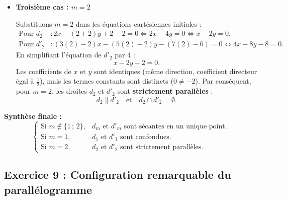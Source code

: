\documentclass[11pt,a4paper]{article}
\begin{document}
\begin{correctionbox}
\begin{itemize}[leftmargin=1cm]
    Substituons $m = 1$ dans les équations cartésiennes initiales :
    \begin{align*}
    \text{Pour } d_1 &: 1x - (1 + 2)y + 1 - 2 = 0 \iff x - 3y - 1 = 0. \\
    \text{Pour } d'_1 &: (3(1) - 2)x - (5(1) - 2)y - (7(1) - 6) = 0 \iff 1x - 3y - 1 = 0 \iff x - 3y - 1 = 0.
    \end{align*}
    Les deux droites admettent exactement la même équation cartésienne.
    Par conséquent, pour $m = 1$, les droites $d_1$ et $d'_1$ sont \textbf{confondues} :
    \[
    d_1 = d'_1.
    \]

    \item \textbf{Troisième cas : $m = 2$}
    
    Substituons $m = 2$ dans les équations cartésiennes initiales :
    \begin{align*}
    \text{Pour } d_2 &: 2x - (2 + 2)y + 2 - 2 = 0 \iff 2x - 4y = 0 \iff x - 2y = 0. \\
    \text{Pour } d'_2 &: (3(2) - 2)x - (5(2) - 2)y - (7(2) - 6) = 0 \iff 4x - 8y - 8 = 0.
    \end{align*}
    En simplifiant l'équation de $d'_2$ par 4 :
    \[
    x - 2y - 2 = 0.
    \]
    Les coefficients de $x$ et $y$ sont identiques (même direction, coefficient directeur égal à $\frac{1}{2}$), mais les termes constants sont distincts ($0 \neq -2$).
    Par conséquent, pour $m = 2$, les droites $d_2$ et $d'_2$ sont \textbf{strictement parallèles} :
    \[
    d_2 \parallel d'_2 \quad \text{et} \quad d_2 \cap d'_2 = \emptyset.
    \]
\end{itemize}

\textbf{Synthèse finale :}
\[
\begin{cases}
\text{Si } m \notin \{1 \,;\, 2\}, & d_m \text{ et } d'_m \text{ sont sécantes en un unique point.} \\
\text{Si } m = 1, & d_1 \text{ et } d'_1 \text{ sont confondues.} \\
\text{Si } m = 2, & d_2 \text{ et } d'_2 \text{ sont strictement parallèles.}
\end{cases}
\]
\end{correctionbox}

\newpage
\subsection*{Exercice 9 : Configuration remarquable du parallélogramme}
\end{document}
